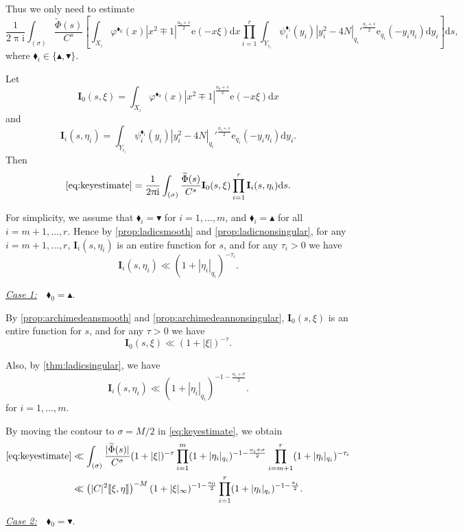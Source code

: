 \documentclass[10pt,oneside,reqno]{amsart}
\makeatletter
\newcommand\rmd{\mathrm{d}}
\newcommand\rme{\mathrm{e}}
\newcommand\rmi{\mathrm{i}}
\newcommand\bI{\mathbf{I}}
\newcommand\dpii{2\uppi\rmi}
\theoremstyle{THEOREM}
\theoremstyle{DEFINITION}
\theoremstyle{EXERCISE}
\numberwithin{equation}{section}
\renewenvironment{proof}[1][\proofname]{\par
  \vspace{-6pt}
  \pushQED{\qed}
  \normalfont \topsep6\p@\@plus6\p@\relax
  \trivlist
  \item[\hskip\labelsep\rmfamily\bfseries
    #1\@addpunct{:}]\ignorespaces
}{
  \popQED\endtrivlist\@endpefalse
  \vspace{-6pt}
}
\makeatother
\begin{document}
\begin{proof}[Proof of \autoref{thm:mainfourierestimate}]
Thus we only need to estimate
\begin{equation}\label{eq:keyestimate}
\frac{1}{\dpii}\int_{(\sigma)}\frac{\widetilde{\Phi}(s)}{C^s}\left[ \int_{X_\iota}\varphi^{\blacklozenge_0}(x)|x^2\mp 1|^{\frac{a_0+s}{2}}\rme(-x\xi)\rmd x\prod_{i=1}^{r}\int_{Y_{\epsilon_i}}\psi_i^{\blacklozenge_i}(y_i)|y_i^2-4N|_{q_i}'^{\frac{a_i+s}{2}}\rme_{q_i}(-y_i\eta_i)\rmd y_i\right]\rmd s,
\end{equation}
where $\blacklozenge_i\in \{\blacktriangle,\blacktriangledown\}$.

Let
\[
\bI_0(s,\xi)=\int_{X_\iota}\varphi^{\blacklozenge_0}(x)|x^2\mp 1|^{\frac{a_0+s}{2}}\rme(-x\xi)\rmd x
\]
and
\[
\bI_i(s,\eta_i)=\int_{Y_{\epsilon_i}}\psi_i^{\blacklozenge_i}(y_i)|y_i^2-4N|_{q_i}'^{\frac{a_i+s}{2}}\rme_{q_i}(-y_i\eta_i)\rmd y_i.
\]
Then
\[
\eqref{eq:keyestimate}=\frac{1}{\dpii}\int_{(\sigma)}\frac{\widetilde{\Phi}(s)}{C^s}\bI_0(s,\xi) \prod_{i=1}^{r}\bI_i(s,\eta_i)\rmd s.
\]

For simplicity, we assume that $\blacklozenge_i=\blacktriangledown$ for $i=1,\dots,m$, and $\blacklozenge_i=\blacktriangle$ for all $i=m+1,\dots,r$. Hence by \autoref{prop:ladicsmooth} and \autoref{prop:ladicnonsingular}, for any $i=m+1,\dots,r$, $\bI_i(s,\eta_i)$ is an entire function for $s$, and for any $\tau_i>0$ we have
\[
\bI_i(s,\eta_i)\ll (1+|\eta_i|_{q_i})^{-\tau_i}.
\]

\underline{\emph{Case 1:}}\ \ $\blacklozenge_0=\blacktriangle$. 

By \autoref{prop:archimedeansmooth} and \autoref{prop:archimedeannonsingular}, $\bI_0(s,\xi)$ is an entire function for $s$, and for any $\tau>0$ we have 
\[
\bI_0(s,\xi)\ll (1+|\xi|)^{-\tau}.
\] 

Also, by \autoref{thm:ladicsingular}, we have
\[
\bI_i(s,\eta_i)\ll (1+|\eta_i|_{q_i})^{-1-\frac{a_i+\sigma}{2}}.
\]
for $i=1,\dots,m$.

By moving the contour to $\sigma=M/2$ in \eqref{eq:keyestimate}, we obtain 
\begin{align*}
  \eqref{eq:keyestimate} & \ll \int_{(\sigma)}\frac{|\widetilde{\Phi}(s)|}{C^\sigma}(1+|\xi|)^{-\tau}\prod_{i=1}^{m} (1+|\eta_i|_{q_i})^{-1-\frac{a_i+\sigma}{2}} \prod_{i=m+1}^{r}(1+|\eta_i|_{q_i})^{-\tau_i} \\
 & \ll \left(|C|^2\llbracket\xi,\eta\rrbracket\right)^{-M} (1+|\xi|_\infty)^{-1-\frac{a_0}{2}}\prod_{i=1}^{r}(1+|\eta_i|_{q_i})^{-1-\frac{a_i}{2}}.
\end{align*}

\underline{\emph{Case 2:}}\ \ $\blacklozenge_0=\blacktriangledown$. 


\end{proof}
\end{document}
